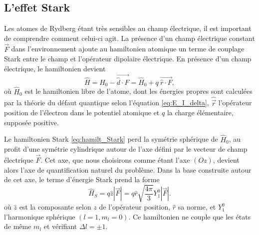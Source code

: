 	\subsection{L'effet Stark}\label{sec:Stark}
\noindent Les atomes de Rydberg étant très sensibles au champ électrique, il est important de comprendre comment celui-ci agit.
La présence d'un champ électrique constant $\vec{F}$ dans l'environnement ajoute au hamiltonien atomique un terme de couplage \og Stark \fg{}  entre le champ et l'opérateur dipolaire électrique.
En présence d'un champ électrique, le hamiltonien devient
\begin{equation}
\label{eq:hamilt_Stark}
\hat{H} = \hat{H}_0 - \vec{\hat{d} \cdot F} = \hat{H}_0 + q~\vec{\hat{r}\cdot F},
\end{equation}
où $\hat{H}_0$ est le hamiltonien libre de l'atome, dont les énergies propres sont calculées par la théorie du défaut quantique selon l'équation \eqref{eq:E_I_delta}, $\hat{\vec{r}}$ l'opérateur position de l'électron dans le potentiel atomique et $q$ la charge élémentaire, supposée positive.

Le hamiltonien Stark \eqref{eq:hamilt_Stark} perd la symétrie sphérique de $\hat{H}_0$, au profit d'une symétrie cylindrique autour de l'axe défini par le vecteur de champ électrique $\vec{F}$.
Cet axe, que nous choisirons comme étant l'axe $(Oz)$, devient alors l'axe de quantification naturel du problème.
Dans la base construite autour de cet axe, le terme d'énergie Stark prend la forme
\begin{equation}
\label{eq:dipole_Stark}
\hat{H}_S = q\hat{z}|\vec{F}| = q\hat{r} \sqrt{\frac{4\pi}{3}} Y_1^0  |\vec{F}|.
\end{equation}
où $\hat{z}$ est la composante selon $z$ de l'opérateur position, $\hat{r}$ sa norme, et $Y_
1^0$ l'harmonique sphérique $(l=1,m_l=0)$.
Ce hamiltonien ne couple que les états de même $m_l$ et vérifiant $\Delta l = \pm 1$.

